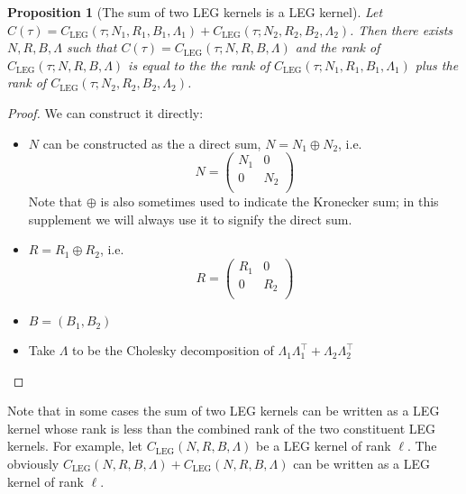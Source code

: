 \documentclass{article}
\newtheorem{prop}{Proposition}
\theoremstyle{definition}
\newcommand{\LEG}{\mathrm{LEG}}
\begin{document}
\begin{prop}[The sum of two LEG kernels is a LEG kernel] \label{prop:additiveleg}
Let $C(\tau) = C_\LEG(\tau;N_1,R_1,B_1,\Lambda_1) + C_\LEG(\tau;N_2,R_2,B_2,\Lambda_2)$.  Then there exists $N,R,B,\Lambda$ such that $C(\tau)=C_\LEG(\tau;N,R,B,\Lambda)$ and the rank of $C_\LEG(\tau;N,R,B,\Lambda)$ is equal to the the rank of $C_\LEG(\tau;N_1,R_1,B_1,\Lambda_1)$ plus the rank of $C_\LEG(\tau;N_2,R_2,B_2,\Lambda_2)$.
\end{prop}
\begin{proof}
We can construct it directly:
\begin{itemize}
    \item $N$ can be constructed as the a direct sum, $N = N_1 \oplus N_2$, i.e.
    \[
    N = \left(
    \begin{array}{cc}
    N_1 & 0 \\
    0 & N_2 \\
    \end{array}
    \right)
    \]
    Note that $\oplus$ is also sometimes used to indicate the Kronecker sum; in this supplement we will always use it to signify the direct sum.
    \item $R = R_1 \oplus R_2$, i.e.
    \[
    R = \left(
    \begin{array}{cc}
    R_1 & 0 \\
    0 & R_2 \\
    \end{array}
    \right)
    \]
    \item $B = (B_1, B_2)$
    \item Take $\Lambda$ to be the Cholesky decomposition of $\Lambda_1 \Lambda_1^\top + \Lambda_2 \Lambda_2^\top$
\end{itemize}
\end{proof}

Note that in some cases the sum of two LEG kernels can be written as a LEG kernel whose rank is less than the combined rank of the two constituent LEG kernels.  For example, let $C_\LEG(N,R,B,\Lambda)$ be a LEG kernel of rank $\ell$.  The obviously $C_\LEG(N,R,B,\Lambda)+C_\LEG(N,R,B,\Lambda)$ can be written as a LEG kernel of rank $\ell$.  

                                         
\end{document}
